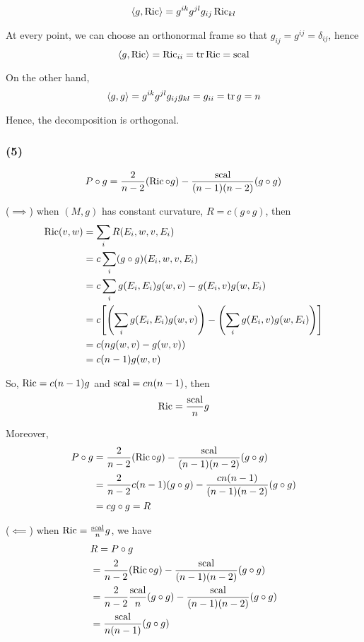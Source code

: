 $$
	\langle g, \operatorname{Ric}\rangle = g^{ik} g^{jl} g_{ij} \operatorname{Ric}_{kl}
$$

At every point, we can choose an orthonormal frame so that $g_{ij} = g^{ij} = \delta_{ij}$, hence
$$
	\langle g, \operatorname{Ric}\rangle = \operatorname{Ric}_{ii} = \operatorname{tr} \operatorname{Ric} = \operatorname{scal}
$$

On the other hand,
$$
	\langle g, g\rangle = g^{ik} g^{jl} g_{ij} g_{kl} = g_{ii} = \operatorname{tr} g = n
$$

Hence, the decomposition is orthogonal.


\subsubsection{(5)}

$$
	P \circ g = \frac{2}{n-2} (\operatorname{Ric} \circ g) - \frac{\operatorname{scal}}{(n-1)(n-2)} (g \circ g)
$$

($\implies$) when $(M, g)$ has constant curvature, $R = c (g \circ g)$, then 
\begin{align*}
	\Ric(v, w)
	&= \sum_i R(E_i, w, v, E_i) \\
	&= c \sum_i (g \circ g)(E_i, w, v, E_i) \\
	&= c \sum_i g(E_i, E_i) g(w, v) - g(E_i, v) g(w, E_i) \\
	&= c \bracket*{\tuple*{\sum_i g(E_i, E_i) g(w, v)} - \tuple*{\sum_i g(E_i, v) g(w, E_i)}} \\
	&= c (n g(w, v) - g(w, v))  \\
	&= c(n-1) g(w, v)
\end{align*}

So, $\operatorname{Ric} = c(n-1) g$ and $\operatorname{scal} = c n (n-1)$, then
$$
	\operatorname{Ric} = \frac{\operatorname{scal}}{n} g
$$

Moreover,
\begin{align*}
	P \circ g
	&= \frac{2}{n-2} (\operatorname{Ric} \circ g) - \frac{\operatorname{scal}}{(n-1)(n-2)} (g \circ g) \\
	&= \frac{2}{n-2} c(n-1) (g \circ g) - \frac{c n (n-1)}{(n-1)(n-2)} (g \circ g) \\
	&= c g \circ g = R
\end{align*}

($\impliedby$) when $\operatorname{Ric} = \frac{\operatorname{scal}}{n} g$, we have
\begin{align*}
	&R = P \circ g \\
	&= \frac{2}{n-2} (\operatorname{Ric} \circ g) - \frac{\operatorname{scal}}{(n-1)(n-2)} (g \circ g) \\
	&= \frac{2}{n-2} \frac{\operatorname{scal}}{n} (g \circ g) - \frac{\operatorname{scal}}{(n-1)(n-2)} (g \circ g) \\
	&= \frac{\operatorname{scal}}{n(n-1)} (g \circ g) 
\end{align*}

